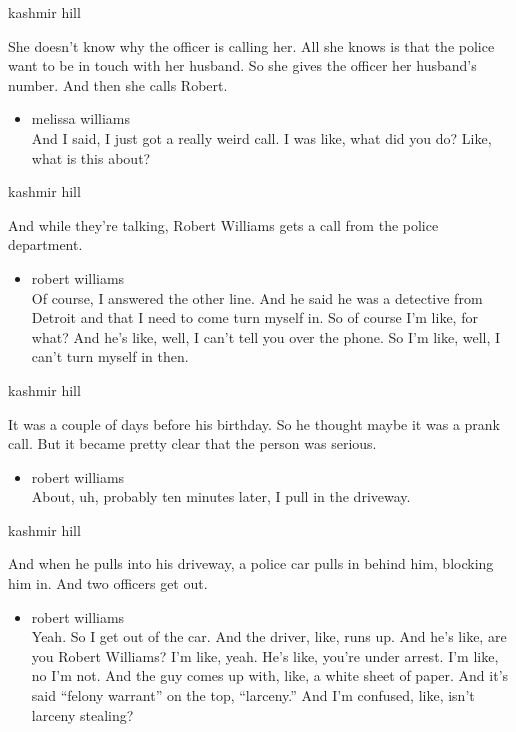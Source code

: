 kashmir hill

She doesn't know why the officer is calling her. All she knows is that
the police want to be in touch with her husband. So she gives the
officer her husband's number. And then she calls Robert.

\begin{itemize}
\tightlist
\item
  melissa williams\\
  And I said, I just got a really weird call. I was like, what did you
  do? Like, what is this about?
\end{itemize}

kashmir hill

And while they're talking, Robert Williams gets a call from the police
department.

\begin{itemize}
\tightlist
\item
  robert williams\\
  Of course, I answered the other line. And he said he was a detective
  from Detroit and that I need to come turn myself in. So of course I'm
  like, for what? And he's like, well, I can't tell you over the phone.
  So I'm like, well, I can't turn myself in then.
\end{itemize}

kashmir hill

It was a couple of days before his birthday. So he thought maybe it was
a prank call. But it became pretty clear that the person was serious.

\begin{itemize}
\tightlist
\item
  robert williams\\
  About, uh, probably ten minutes later, I pull in the driveway.
\end{itemize}

kashmir hill

And when he pulls into his driveway, a police car pulls in behind him,
blocking him in. And two officers get out.

\begin{itemize}
\tightlist
\item
  robert williams\\
  Yeah. So I get out of the car. And the driver, like, runs up. And he's
  like, are you Robert Williams? I'm like, yeah. He's like, you're under
  arrest. I'm like, no I'm not. And the guy comes up with, like, a white
  sheet of paper. And it's said ``felony warrant'' on the top,
  ``larceny.'' And I'm confused, like, isn't larceny stealing?
\end{itemize}

